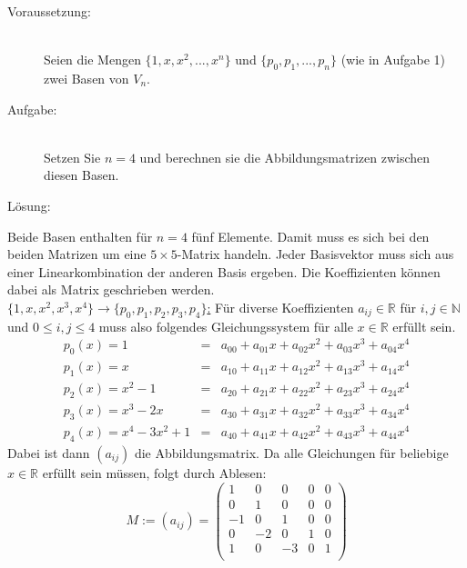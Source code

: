 \documentclass[10pt, a4paper]{article}
\begin{document}
		\begin{description}
			\item[Voraussetzung:] \hfill \\
				Seien die Mengen $\{1,x,x^2,...,x^n\}$ und $\{p_0,p_1,...,p_n\}$ (wie in Aufgabe 1) zwei Basen von $V_n$.
			\item[Aufgabe:] \hfill \\
				Setzen Sie $n=4$ und berechnen sie die Abbildungsmatrizen zwischen diesen Basen.
			\item[Lösung:]
		\end{description}
		
		Beide Basen enthalten für $n=4$ fünf Elemente. Damit muss es sich bei den beiden Matrizen um eine $5\times 5$-Matrix handeln. Jeder Basisvektor muss sich aus einer Linearkombination der anderen Basis ergeben.
		Die Koeffizienten können dabei als Matrix geschrieben werden.\\

		\underline{$\{1,x,x^2,x^3,x^4\} \longrightarrow \{p_0,p_1,p_2,p_3,p_4\}$:}
		Für diverse Koeffizienten $a_{ij} \in \mathbb{R}$ für $i,j \in \mathbb{N}$ und $0 \leq i,j \leq 4$ muss also folgendes Gleichungssystem für alle $x \in \mathbb{R}$ erfüllt sein.
		\begin{eqnarray*}
			p_0(x) = 1 &=& a_{00} + a_{01}x + a_{02}x^2 + a_{03}x^3 +a_{04}x^4 \\
			p_1(x) = x &=& a_{10} + a_{11}x + a_{12}x^2 + a_{13}x^3 +a_{14}x^4 \\
			p_2(x) = x^2 -1 &=& a_{20} + a_{21}x + a_{22}x^2 + a_{23}x^3 +a_{24}x^4 \\
			p_3(x) = x^3-2x &=& a_{30} + a_{31}x + a_{32}x^2 + a_{33}x^3 +a_{34}x^4 \\
			p_4(x) = x^4 -3x^2 + 1 &=& a_{40} + a_{41}x + a_{42}x^2 + a_{43}x^3 +a_{44}x^4 
		\end{eqnarray*}
		Dabei ist dann $(a_{ij})$ die Abbildungsmatrix. Da alle Gleichungen für beliebige $x\in \mathbb{R}$ erfüllt sein müssen, folgt durch Ablesen:
		\[
			M := (a_{ij}) = 
			\begin{pmatrix}
				1 & 0 & 0 & 0 & 0 \\
				0 & 1 & 0 & 0 & 0 \\
				-1 & 0 & 1 & 0 & 0 \\
				0 & -2 & 0 & 1 & 0 \\
				1 & 0 & -3 & 0 & 1 \\
			\end{pmatrix}
		\]
\end{document}
